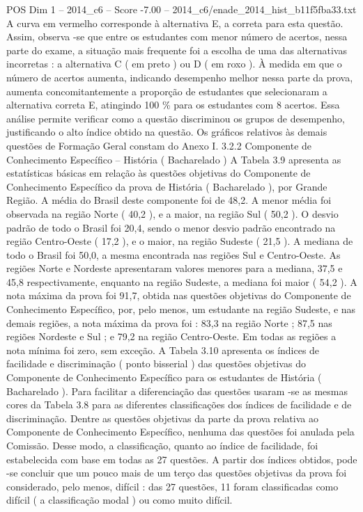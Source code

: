 \begin{textsample}{POS Dim 1 – 2014\_c6 – Score -7.00 – 2014\_c6/enade\_2014\_hist\_b11f5fba33.txt}
A curva em vermelho corresponde à alternativa E, a correta para esta questão.
Assim, observa -se que entre os estudantes com menor número de acertos, nessa parte do exame, a situação mais frequente foi a escolha de uma das alternativas incorretas : a alternativa C ( em preto ) ou D ( em roxo ).
À medida em que o número de acertos aumenta, indicando desempenho melhor nessa parte da prova, aumenta concomitantemente a proporção de estudantes que selecionaram a alternativa correta E, atingindo 100 \% para os estudantes com 8 acertos.
Essa análise permite verificar como a questão discriminou os grupos de desempenho, justificando o alto índice obtido na questão.
Os gráficos relativos às demais questões de Formação Geral constam do Anexo I. 3.2.2 Componente de Conhecimento Específico – História ( Bacharelado ) A Tabela 3.9 apresenta as estatísticas básicas em relação às questões objetivas do Componente de Conhecimento Específico da prova de História ( Bacharelado ), por Grande Região.
A média do Brasil deste componente foi de 48,2.
A menor média foi observada na região Norte ( 40,2 ), e a maior, na região Sul ( 50,2 ).
O desvio padrão de todo o Brasil foi 20,4, sendo o menor desvio padrão encontrado na região Centro-Oeste ( 17,2 ), e o maior, na região Sudeste ( 21,5 ).
A mediana de todo o Brasil foi 50,0, a mesma encontrada nas regiões Sul e Centro-Oeste.
As regiões Norte e Nordeste apresentaram valores menores para a mediana, 37,5 e 45,8 respectivamente, enquanto na região Sudeste, a mediana foi maior ( 54,2 ).
A nota máxima da prova foi 91,7, obtida nas questões objetivas do Componente de Conhecimento Específico, por, pelo menos, um estudante na região Sudeste, e nas demais regiões, a nota máxima da prova foi : 83,3 na região Norte ; 87,5 nas regiões Nordeste e Sul ; e 79,2 na região Centro-Oeste.
Em todas as regiões a nota mínima foi zero, sem exceção.
A Tabela 3.10 apresenta os índices de facilidade e discriminação ( ponto bisserial ) das questões objetivas do Componente de Conhecimento Específico para os estudantes de História ( Bacharelado ).
Para facilitar a diferenciação das questões usaram -se as mesmas cores da Tabela 3.8 para as diferentes classificações dos índices de facilidade e de discriminação.
Dentre as questões objetivas da parte da prova relativa ao Componente de Conhecimento Específico, nenhuma das questões foi anulada pela Comissão.
Desse modo, a classificação, quanto ao índice de facilidade, foi estabelecida com base em todas as 27 questões.
A partir dos índices obtidos, pode -se concluir que um pouco mais de um terço das questões objetivas da prova foi considerado, pelo menos, difícil : das 27 questões, 11 foram classificadas como difícil ( a classificação modal ) ou como muito difícil.

\end{textsample}
